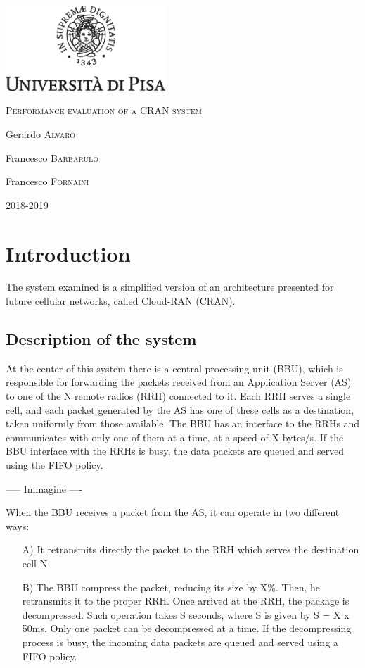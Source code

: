\documentclass[11pt,a4paper,oneside, openright]{article}
\begin{document}
{
  \begin{titlepage}
  	\centering
  	\includegraphics[width=6cm]{images/unipi.eps}\par
  	\vspace{1.5cm}
  	{\huge\textsc{Performance evaluation of a CRAN system}\par}
  	\vspace{2cm}
  	Gerardo \textsc{Alvaro}\par
  	Francesco \textsc{Barbarulo}\par
    Francesco \textsc{Fornaini}

  	\vfill

  	{\large 2018-2019\par}
  \end{titlepage}
}


\tableofcontents

\newpage

\section{Introduction}
The system examined is a simplified version of an architecture presented for future cellular networks, called Cloud-RAN (CRAN).

\subsection{Description of the system}
 At the center of this system there is a central processing unit (BBU), which is responsible for forwarding the packets received from an Application Server (AS) to one of the N remote radios (RRH) connected to it. Each RRH serves a single cell, and each packet generated by the AS has one of these cells as a destination, taken uniformly from those available. The BBU has an interface to the RRHs and communicates with only one of them at a time, at a speed of X bytes/s. If the BBU interface with the RRHs is busy, the data packets are queued and served using the FIFO policy.

----- Immagine ----

When the BBU receives a packet from the AS, it can operate in two different ways:
\begin{itemize}
	\item[A)]It retransmits directly the packet to the RRH which serves the destination cell N
	\item[B)]The BBU compress the packet, reducing its size by X\%. Then, he retransmits it to the proper RRH. Once arrived at the RRH, the package is decompressed. Such operation takes S seconds, where S is given by S = X x 50ms. Only one packet can be decompressed at a time. If the decompressing process is busy, the incoming data packets are queued and served using a FIFO policy.
\end{itemize}
\end{document}
